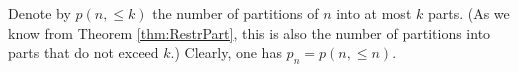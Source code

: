 

\setcounter{section}{3}
\setcounter{subsection}{7}
\setcounter{dfn}{16}

Denote by $p(n, \le k)$ the number of partitions of $n$ into at most $k$ parts.
(As we know from Theorem \ref{thm:RestrPart}, this is also the number of partitions into parts that do not exceed $k$.)
Clearly, one has $p_n = p(n, \le n)$.




